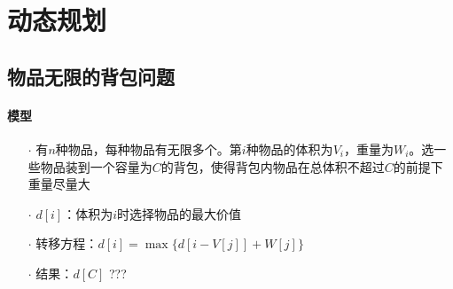\section{动态规划}
\subsection{物品无限的背包问题}
\paragraph{模型}
\begin{itemize}
	\item[$\cdot$] 有$n$种物品，每种物品有无限多个。第$i$种物品的体积为$V_i$，重量为$W_i$。选一些物品装到一个容量为$C$的背包，使得背包内物品在总体积不超过$C$的前提下重量尽量大
	\item[$\cdot$] $d[i]$：体积为$i$时选择物品的最大价值
	\item[$\cdot$] 转移方程：$d[i]=\max \{d[i-V[j]]+W[j]\}$
	\item[$\cdot$] 结果：$d[C]$ ???  
\end{itemize}

